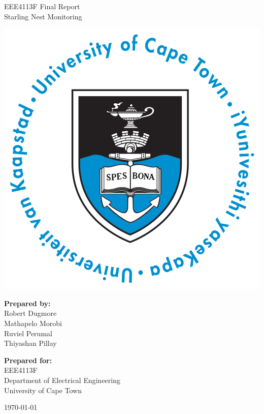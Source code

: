 \thispagestyle{empty}
\begin{center}
    
\Huge

\vspace{5cm}

EEE4113F Final Report \\
Starling Nest Monitoring

\vspace{2.5cm}

\includegraphics[width=0.4\linewidth]{FrontMatter/UCT_logo.png}

\vfill

\large
\textbf{Prepared by:}\\
Robert Dugmore\\
Mathapelo Morobi\\
Ruviel Perumal\\
Thiyashan Pillay

\vspace{1cm}

\textbf{Prepared for:}\\
EEE4113F\\
Department of Electrical Engineering\\
University of Cape Town

\vspace{2cm}

\today


\end{center}
